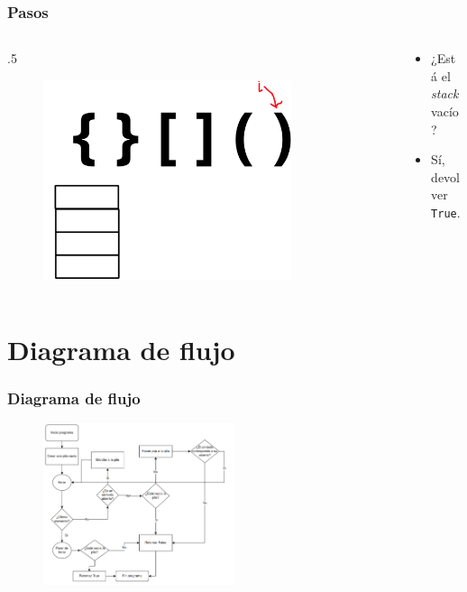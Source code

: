 \documentclass[17pt, t, lualatex]{beamer}
\newcommand{\cppinline}[1]{\lstinline[style=cppstyle]!#1!}
\begin{document}
\begin{frame}
  \frametitle{Pasos}

  \begin{columns}
    \begin{column}{.5\textwidth}
  \begin{figure}[h]
    \centering
    \includegraphics[width=0.8\textwidth]{img/Problema1-6.png}
  \end{figure}
    \end{column}

    \begin{column}{.5\textwidth}
      \begin{itemize}
        \item ¿Está el \textit{stack} vacío?
        \item Sí, devolver \cppinline{True}.
      \end{itemize}
    \end{column}
  \end{columns}

\end{frame}

\section{Diagrama de flujo}

\insertsectionpage

\begin{frame}
  \frametitle{Diagrama de flujo}
  \begin{figure}[h]
    \centering
    \includegraphics[width=0.5\textwidth]{img/Problema1-7.png}
  \end{figure}
\end{frame}
\end{document}
